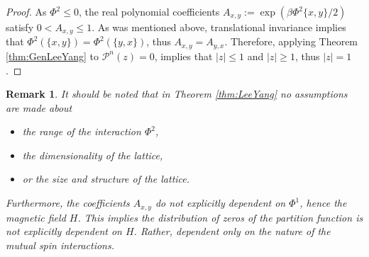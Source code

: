 \documentclass[english,12pt]{ttuthes}
\newtheorem{remark}{Remark}[chapter]
\begin{document}
%
\begin{proof}
 As $\Phi^2\leq0$, the real polynomial coefficients
 $A_{x,y}:=\exp{(\beta\Phi^2\{x,y\}/2)}$  satisfy $0<A_{x,y}\leq1$. As was
 mentioned above, translational invariance implies that
 $\Phi^2(\{x,y\})=\Phi^2(\{y,x\})$, thus $A_{x,y}=A_{y,x}$. Therefore, applying
 Theorem \ref{thm:GenLeeYang} to $\mathcal{P}^n(z)=0$, implies that
 $|z|\leq1$ and $|z|\geq1$, thus $|z|=1$.     
\end{proof}
%
\begin{remark}
\label{rem:LeeYang}  
It should be noted that in Theorem \ref{thm:LeeYang} no assumptions
are made about
%
\begin{itemize}
  \item the range of the interaction $\Phi^2$,
  \item the dimensionality of the lattice,
  \item or the size and structure of the lattice.
\end{itemize}
%
Furthermore, the coefficients $A_{x,y}$ do not explicitly dependent on
$\Phi^1$, hence the magnetic field $H$. This implies the distribution of
zeros of the partition function is not explicitly dependent on
$H$. Rather, dependent only on the nature of the mutual spin interactions.   
\end{remark}
\end{document}
